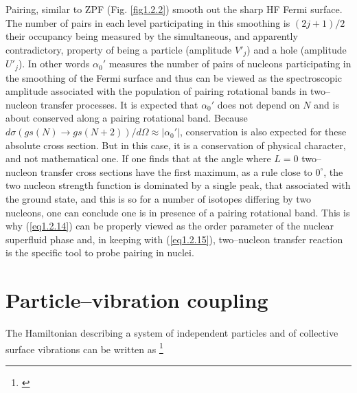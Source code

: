 Pairing, similar to ZPF (Fig. \ref{fig1.2.2}) smooth out the sharp HF Fermi surface. The number of pairs in each level participating in this smoothing is $(2j+1)/2$ their occupancy being measured by the simultaneous, and apparently contradictory, property of being a particle (amplitude $V'_j$) and a hole (amplitude $U'_j$). In other words $\alpha_0'$ measures the number of pairs of nucleons participating in the smoothing of the Fermi surface and thus can be viewed as the spectroscopic amplitude associated with the population of pairing rotational bands in two--nucleon transfer processes. It is expected that $\alpha_0'$ does not depend on $N$ and is about conserved along a pairing rotational band. Because $d\sigma(gs(N)\rightarrow gs(N+2))/d\Omega\approx|\alpha_0'|$, conservation is also expected for these absolute cross section. But in this case, it is a conservation of physical character, and not mathematical one. If one finds that at the angle where $L=0$ two--nucleon transfer cross sections have the first maximum, as a rule close to $0^\circ$, the two nucleon strength function is dominated by a single peak, that associated with the ground state, and this is so for a number of isotopes differing by two nucleons, one can conclude one is in presence of a pairing rotational band. This is why (\ref{eq1.2.14}) can be properly viewed as the order parameter of the nuclear superfluid phase and, in keeping with (\ref{eq1.2.15}), two--nucleon transfer reaction is the specific tool to probe pairing in nuclei.
\section{Particle--vibration coupling}\label{appintroD}
The Hamiltonian describing a system of independent particles and of collective surface vibrations can be written as \footnote{\cite{Bohr:75,Brink:05}}


